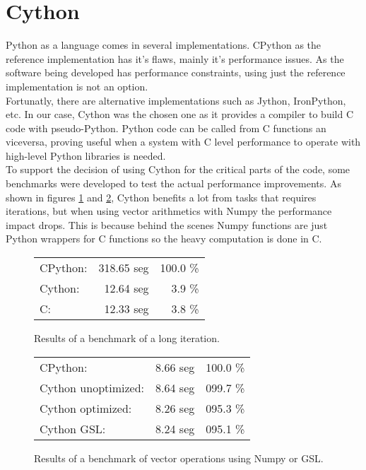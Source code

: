 \section{Cython}

Python as a language comes in several implementations. CPython as the reference
implementation has it's flaws, mainly it's performance issues. As the
software being developed has performance constraints, using just the reference
implementation is not an option.\\

Fortunatly, there are alternative implementations such as Jython, IronPython,
etc. In our case, Cython\cite{Cython}\cite{Cython_book} was the chosen one as
it provides a compiler to build C code with pseudo-Python. Python code can be
called from C functions an viceversa, proving useful when a system
with C level performance to operate with high-level Python libraries is needed.\\

To support the decision of using Cython for the critical parts of the code,
some benchmarks were developed to test the actual performance improvements. As
shown in figures \ref{Cython:fig:1} and \ref{Cython:fig:2}, Cython benefits
a lot from tasks that requires iterations, but when using vector arithmetics
with Numpy the performance impact drops. This is because behind the scenes
Numpy functions are just Python wrappers for C functions so the heavy
computation is done in C.\\

\begin{figure}[ht!]
  \begin{center}
    \begin{tabular}{l r r}
      CPython:  & 318.65 seg & 100.0 \% \\
      Cython:   & 12.64 seg  & 3.9 \%   \\
      C:        & 12.33 seg  & 3.8 \%   \\
    \end{tabular}
  \end{center}
  \caption{Results of a benchmark of a long iteration.}
  \label{Cython:fig:1}
\end{figure}

\begin{figure}[ht!]
  \begin{center}
    \begin{tabular}{l r r}
      CPython:            & 8.66 seg & 100.0 \% \\
      Cython unoptimized: & 8.64 seg & 099.7 \% \\
      Cython optimized:   & 8.26 seg & 095.3 \% \\
      Cython GSL:         & 8.24 seg & 095.1 \%
    \end{tabular}
  \end{center}
  \caption{Results of a benchmark of vector operations using Numpy or GSL.}
  \label{Cython:fig:2}
\end{figure}

